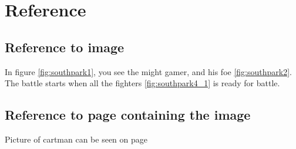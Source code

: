 \section{Reference}
\subsection {Reference to image}
In figure \ref{fig:southpark1}, you see the might gamer, and his foe \ref{fig:southpark2}.
The battle starts when all the fighters \ref{fig:southpark4_1} is ready for battle.
\subsection{Reference to page containing the image}
Picture of cartman can be seen on page \pageref{fig:southpark2}